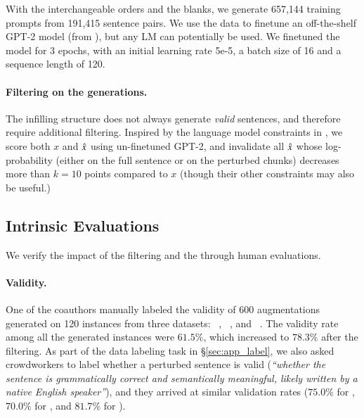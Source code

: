 With the interchangeable orders and the blanks, we generate 657,144 training prompts from 191,415 sentence pairs.
We use the data to finetune an off-the-shelf GPT-2 model (from \citet{Wolf2019HuggingFacesTS}), but any LM can potentially be used.
We finetuned the model for 3 epochs, with an initial learning rate 5e-5, a batch size of 16 and a sequence length of 120.

\paragraph{Filtering on the generations.}
The infilling structure does not always generate \emph{valid} sentences, and therefore require additional filtering.
Inspired by the language model constraints in \citet{morris2020textattack}, we score both $x$ and $\hat{x}$ using un-finetuned GPT-2, and invalidate all $\hat{x}$ whose log-probability (either on the full sentence or on the perturbed chunks) decreases more than $k=10$ points compared to $x$ (though their other constraints may also be useful.)



\subsection{Intrinsic Evaluations}
We verify the impact of the filtering and the \tagstrs through human evaluations.
\paragraph{Validity.}
One of the coauthors manually labeled the validity of 600 augmentations generated on 120 instances from three datasets: \dsst~\cite{socher2013recursive}, \dnli~\cite{bowman-etal-2015-large}, and \dqqp~\cite{wang2018glue}.
The validity rate among all the generated instances were $61.5\%$, which increased to $78.3\%$ after the filtering. 
As part of the data labeling task in \S\ref{sec:app_label}, we also asked crowdworkers to label whether a perturbed sentence is valid (\emph{``whether the sentence is grammatically correct and semantically meaningful, likely written by a native English speaker''}), and they arrived at similar validation rates ($75.0\%$ for \dsst, $70.0\%$ for \dqqp, and $81.7\%$ for \dnli).


